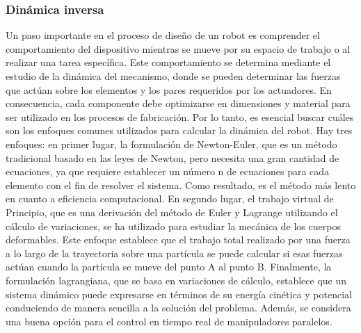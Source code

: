     \newpage


    \subsubsection{Dinámica inversa}
    
        Un paso importante en el proceso de diseño de un robot es comprender el comportamiento del dispositivo mientras se mueve por su espacio de trabajo o al realizar una tarea específica. Este comportamiento se determina mediante el estudio de la dinámica del mecanismo, donde se pueden determinar las fuerzas que actúan sobre los elementos y los pares requeridos por los actuadores. En consecuencia, cada componente debe optimizarse en dimensiones y material para ser utilizado en los procesos de fabricación. Por lo tanto, es esencial buscar cuáles son los enfoques comunes utilizados para calcular la dinámica del robot. Hay tres enfoques: en primer lugar, la formulación de Newton-Euler, que es un método tradicional basado en las leyes de Newton, pero necesita una gran cantidad de ecuaciones, ya que requiere establecer un número n de ecuaciones para cada elemento con el fin de resolver el sistema. Como resultado, es el método más lento en cuanto a eficiencia computacional. En segundo lugar, el trabajo virtual de Principio, que es una derivación del método de Euler y Lagrange utilizando el cálculo de variaciones, se ha utilizado para estudiar la mecánica de los cuerpos deformables. Este enfoque establece que el trabajo total realizado por una fuerza a lo largo de la trayectoria sobre una partícula se puede calcular si esas fuerzas actúan cuando la partícula se mueve del punto A al punto B. Finalmente, la formulación lagrangiana, que se basa en variaciones de cálculo, establece que un sistema dinámico puede expresarse en términos de su energía cinética y potencial conduciendo de manera sencilla a la solución del problema. Además, se considera una buena opción para el control en tiempo real de manipuladores paralelos.
    
